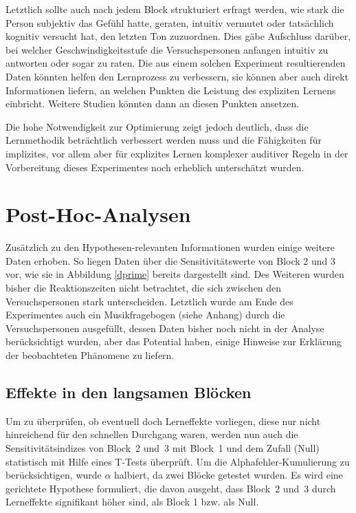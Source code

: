 \documentclass[doc,a4paper,12pt]{apa6}
\begin{document}
Letztlich sollte auch nach jedem Block strukturiert erfragt werden, wie stark die Person subjektiv das Gefühl hatte, geraten, intuitiv vermutet oder tatsächlich kognitiv versucht hat, den letzten Ton zuzuordnen. Dies gäbe Aufschluss darüber, bei welcher Geschwindigkeitsstufe die Versuchspersonen anfangen intuitiv zu antworten oder sogar zu raten. Die aus einem solchen Experiment resultierenden Daten könnten helfen den Lernprozess zu verbessern, sie können aber auch direkt Informationen liefern, an welchen Punkten die Leistung des expliziten Lernens einbricht. Weitere Studien könnten dann an diesen Punkten ansetzen.

Die hohe Notwendigkeit zur Optimierung zeigt jedoch deutlich, dass die Lernmethodik beträchtlich verbessert werden muss und die Fähigkeiten für implizites, vor allem aber für explizites Lernen komplexer auditiver Regeln in der Vorbereitung dieses Experimentes noch erheblich unterschätzt wurden.

\section{Post-Hoc-Analysen}

Zusätzlich zu den Hypothesen-relevanten Informationen wurden einige weitere Daten erhoben. So liegen Daten über die Sensitivitätswerte von Block 2 und 3 vor, wie sie in Abbildung \ref{dprime} bereits dargestellt sind. Des Weiteren wurden bisher die Reaktionszeiten nicht betrachtet, die sich zwischen den Versuchspersonen stark unterscheiden. Letztlich wurde am Ende des Experimentes auch ein Musikfragebogen (siehe Anhang) durch die Versuchspersonen ausgefüllt, dessen Daten bisher noch nicht in der Analyse berücksichtigt wurden, aber das Potential haben, einige Hinweise zur Erklärung der beobachteten Phänomene zu liefern.

\subsection{Effekte in den langsamen Blöcken}

Um zu überprüfen, ob eventuell doch Lerneffekte vorliegen, diese nur nicht hinreichend für den schnellen Durchgang waren, werden nun auch die Sensitivitätsindizes von Block~2 und~3 mit Block~1 und dem Zufall (Null) statistisch mit Hilfe eines T-Tests überprüft. Um die Alphafehler-Kumulierung zu berücksichtigen, wurde $\alpha$ halbiert, da zwei Blöcke getestet wurden. Es wird eine gerichtete Hypothese formuliert, die davon ausgeht, dass Block~2 und~3 durch Lerneffekte signifikant höher sind, als Block 1 bzw. als Null.
\end{document}
